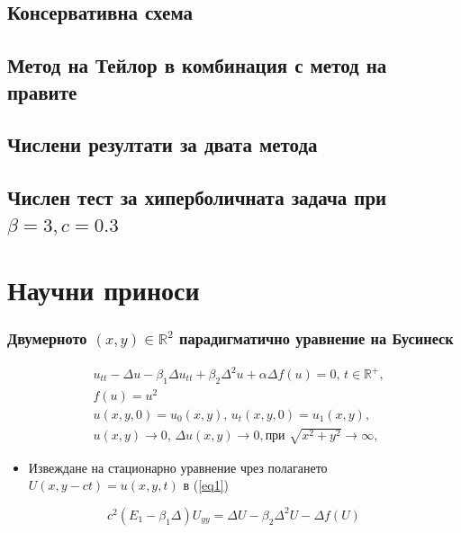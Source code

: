 \documentclass{beamer}
\newcommand{\RR}{\mathbb{R}}
\newcommand{\rf}[1]{(\ref{#1})}
\begin{document}
\begin{frame}
\subsection{Консервативна схема}
\subsection{Метод на Тейлор в комбинация с метод на правите}
\subsection{Числени резултати за двата метода}
\subsection{Числен тест за хиперболичната задача при $\beta = 3, c=0.3$}
\section{Научни приноси}
\end{frame}

\begin{frame}
\frametitle{ Двумерното $(x,y) \in \RR^2$ парадигматично уравнение на Бусинеск }
\begin{align}
&u_{tt} - \Delta u -\beta_1  \Delta u_{tt} +\beta_2 \Delta ^2 u +\alpha \Delta f(u)=0, \, t\in\RR^+,\label{eq1}
\\
&f(u) =  u^2 \nonumber \\  \nonumber &u(x,y,0)=u_0(x,y), \, u_t(x,y,0)=u_1(x,y)  , 
\\  &u(x,y) \rightarrow 0, \,  \Delta u(x,y) \rightarrow 0 ,  \text {при } \sqrt{x^2 + y^2} \rightarrow \infty, \label{eq11} 
\end{align}
\begin{itemize}
  \item Извеждане на {\color{red}стационарно} уравнение чрез полагането $U(x,y-ct)=u(x,y,t)$ в \rf{eq1}
\end{itemize}
\color{red}
\begin{equation}
c^2 (E_1-\beta_1 \Delta) U_{yy} = \Delta U -\beta_2 \Delta^2 U - \Delta f(U)
\end{equation}

\end{frame}
\end{document}
